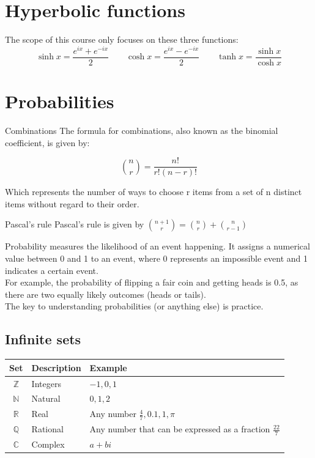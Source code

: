 \documentclass{article}
\begin{document}
\section{Hyperbolic functions}
The scope of this course only focuses on these three functions:
\[\sinh x=\frac{e^{ix}+e^{-ix}}{2}\quad\quad\cosh x=\frac{e^{ix}-e^{-ix}}{2}\quad\quad\tanh x=\frac{\sinh x}{\cosh x}\]

\section{Probabilities}
\begin{knBox}[]{Combinations}
    The formula for combinations, also known as the binomial coefficient, is given by:
    
    \[
    \binom{n}{r} = \frac{n!}{r!(n-r)!}
    \]
    
    Which represents the number of ways to choose r items from a set of n distinct items without regard to their order.
\end{knBox}

\begin{propBox}[]{Pascal's rule}
    Pascal's rule is given by $\binom{n+1}{r}=\binom{n}{r}+\binom{n}{r-1}$
\end{propBox}
Probability measures the likelihood of an event happening. It assigns a numerical value between 0 and 1 to an event, where 0 represents an impossible event and 1 indicates a certain event.\\For example, the probability of flipping a fair coin and getting heads is 0.5, as there are two equally likely outcomes (heads or tails).\\The key to understanding probabilities (or anything else) is practice.

\subsection{Infinite sets}
\begin{table}[ht]
    \begin{tabular}{|c|l|l|}
    \hline
    \textbf{Set} & \textbf{Description} & \textbf{Example} \\
    \hline
    $\mathds{Z}$ & Integers & $-1,0,1$\\
    \hline
    $\mathds{N}$ & Natural & $0,1,2$\\
    \hline
    $\mathds{R}$ & Real & Any number $\frac{4}{7}, 0.1, 1, \pi$\\
    \hline
    $\mathds{Q}$ & Rational & Any number that can be expressed as a fraction $\frac{22}{7}$\\
    \hline
    $\mathds{C}$ & Complex & $a+bi$ \\
    \hline
    \end{tabular}
\end{table}
\end{document}
